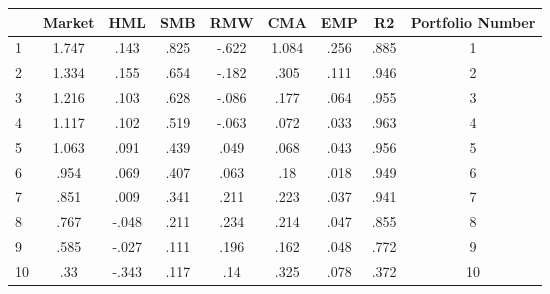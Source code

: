 {
\def\sym#1{\ifmmode^{#1}\else\(^{#1}\)\fi}
\begin{tabular}{l*{1}{cccccccc}}
\hline\hline
            &     Market &         HML&         SMB&         RMW&         CMA&         EMP&          R2&Portfolio Number\\
\hline
1           &       1.747&        .143&        .825&       -.622&       1.084&        .256&        .885&           1\\
2           &       1.334&        .155&        .654&       -.182&        .305&        .111&        .946&           2\\
3           &       1.216&        .103&        .628&       -.086&        .177&        .064&        .955&           3\\
4           &       1.117&        .102&        .519&       -.063&        .072&        .033&        .963&           4\\
5           &       1.063&        .091&        .439&        .049&        .068&        .043&        .956&           5\\
6           &        .954&        .069&        .407&        .063&         .18&        .018&        .949&           6\\
7           &        .851&        .009&        .341&        .211&        .223&        .037&        .941&           7\\
8           &        .767&       -.048&        .211&        .234&        .214&        .047&        .855&           8\\
9           &        .585&       -.027&        .111&        .196&        .162&        .048&        .772&           9\\
10          &         .33&       -.343&        .117&         .14&        .325&        .078&        .372&          10\\
\hline\hline
\end{tabular}
}
